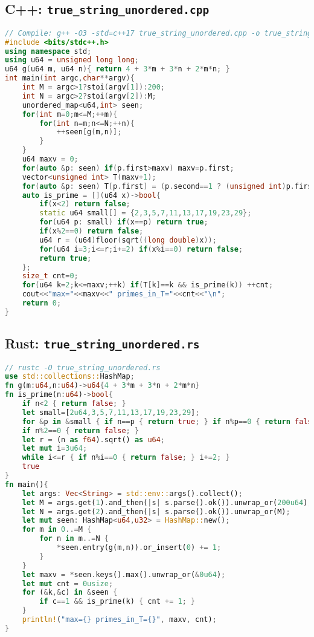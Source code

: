 \documentclass[12pt]{article}
\theoremstyle{definition}
\theoremstyle{plain}
\begin{document}
\subsection{C++: \texttt{true\_string\_unordered.cpp}}
\begin{lstlisting}[language=C++]
// Compile: g++ -O3 -std=c++17 true_string_unordered.cpp -o true_string_unordered
#include <bits/stdc++.h>
using namespace std;
using u64 = unsigned long long;
u64 g(u64 m, u64 n){ return 4 + 3*m + 3*n + 2*m*n; }
int main(int argc,char**argv){
    int M = argc>1?stoi(argv[1]):200;
    int N = argc>2?stoi(argv[2]):M;
    unordered_map<u64,int> seen;
    for(int m=0;m<=M;++m){
        for(int n=m;n<=N;++n){
            ++seen[g(m,n)];
        }
    }
    u64 maxv = 0;
    for(auto &p: seen) if(p.first>maxv) maxv=p.first;
    vector<unsigned int> T(maxv+1);
    for(auto &p: seen) T[p.first] = (p.second==1 ? (unsigned int)p.first : 0);
    auto is_prime = [](u64 x)->bool{
        if(x<2) return false;
        static u64 small[] = {2,3,5,7,11,13,17,19,23,29};
        for(u64 p: small) if(x==p) return true;
        if(x%2==0) return false;
        u64 r = (u64)floor(sqrt((long double)x));
        for(u64 i=3;i<=r;i+=2) if(x%i==0) return false;
        return true;
    };
    size_t cnt=0;
    for(u64 k=2;k<=maxv;++k) if(T[k]==k && is_prime(k)) ++cnt;
    cout<<"max="<<maxv<<" primes_in_T="<<cnt<<"\n";
    return 0;
}
\end{lstlisting}

\subsection{Rust: \texttt{true\_string\_unordered.rs}}
\begin{lstlisting}[language=Rust]
// rustc -O true_string_unordered.rs
use std::collections::HashMap;
fn g(m:u64,n:u64)->u64{4 + 3*m + 3*n + 2*m*n}
fn is_prime(n:u64)->bool{
    if n<2 { return false; }
    let small=[2u64,3,5,7,11,13,17,19,23,29];
    for &p in &small { if n==p { return true; } if n%p==0 { return false; } }
    if n%2==0 { return false; }
    let r = (n as f64).sqrt() as u64;
    let mut i=3u64;
    while i<=r { if n%i==0 { return false; } i+=2; }
    true
}
fn main(){
    let args: Vec<String> = std::env::args().collect();
    let M = args.get(1).and_then(|s| s.parse().ok()).unwrap_or(200u64);
    let N = args.get(2).and_then(|s| s.parse().ok()).unwrap_or(M);
    let mut seen: HashMap<u64,u32> = HashMap::new();
    for m in 0..=M {
        for n in m..=N {
            *seen.entry(g(m,n)).or_insert(0) += 1;
        }
    }
    let maxv = *seen.keys().max().unwrap_or(&0u64);
    let mut cnt = 0usize;
    for (&k,&c) in &seen {
        if c==1 && is_prime(k) { cnt += 1; }
    }
    println!("max={} primes_in_T={}", maxv, cnt);
}
\end{lstlisting}
\end{document}

